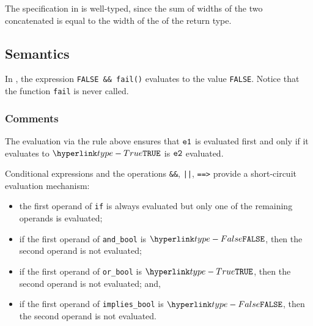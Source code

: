 The specification in  is well-typed, since
the sum of widths of the two concatenated \bitvectortypesterm{}
is equal to the width of the \bitvectortypeterm{} of the return type.


\subsection{Semantics}
In ,
the expression \texttt{FALSE \&\& fail()} evaluates to the value \texttt{FALSE}. Notice that the function \texttt{fail} is never called.


\subsubsection{Comments}
The evaluation via the rule above ensures that $\texttt{e1}$ is evaluated first and
only if it evaluates to $\True$ is $\texttt{e2}$ evaluated.



Conditional expressions and the operations \texttt{\&\&}, \texttt{||},
\texttt{==>} provide a short-circuit evaluation mechanism:

\begin{itemize}
\item the first operand of \texttt{if} is always evaluated but only one of the
remaining operands is evaluated;
\item if the first operand of \texttt{and\_bool} is $\False$, then the second operand is not evaluated;
\item if the first operand of \texttt{or\_bool} is $\True$, then the second operand is not evaluated; and,
\item if the first operand of \texttt{implies\_bool} is $\False$, then the
second operand is not evaluated.
\end{itemize}

